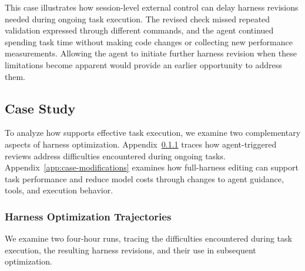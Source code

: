 This case illustrates how session-level external control can delay harness revisions needed during ongoing task execution. The revised check missed repeated validation expressed through different commands, and the agent continued spending task time without making code changes or collecting new performance measurements. Allowing the agent to initiate further harness revision when these limitations become apparent would provide an earlier opportunity to address them.

\FloatBarrier
\subsection{Case Study}
\label{app:case-study}
\begingroup
\lstset{style=harnessdiff}

To analyze how \boxbox{} supports effective task execution, we examine two complementary aspects of harness optimization. Appendix~\ref{app:case-trajectories} traces how agent-triggered reviews address difficulties encountered during ongoing tasks. Appendix~\ref{app:case-modifications} examines how full-harness editing can support task performance and reduce model costs through changes to agent guidance, tools, and execution behavior.

\subsubsection{Harness Optimization Trajectories}
\label{app:case-trajectories}

We examine two four-hour runs, tracing the difficulties encountered during task execution, the resulting harness revisions, and their use in subsequent optimization.

